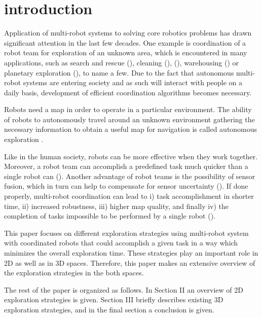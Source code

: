 \section{introduction}


Application of multi-robot systems to solving core robotics problems has drawn significant attention in the last few decades. One example is coordination of a robot team for exploration of an unknown area, which is encountered in many applications, such as search and rescue (\cite{Murphy2004}), cleaning (\cite{Endres}), (\cite{Pinheiro2015}), warehousing (\cite{Wurman2008}) or planetary exploration (\cite{Mataric2001}), to name a few. Due to the fact that autonomous multi-robot systems are entering society and as such will interact with people on a daily basis, development of efficient coordination algorithms becomes necessary.

Robots need a map in order to operate in a particular environment. The ability of robots to autonomously travel around an unknown environment gathering the necessary information to obtain a useful map for navigation is called autonomous exploration \cite{Julia2012}. 

Like in the human society, robots can be more effective when they work together. Moreover, a robot team can accomplish a predefined task much quicker than a single robot can (\cite{Dias2000}). Another advantage of robot teams is the possibility of sensor fusion, which in turn can help to compensate for sensor uncertainty (\cite{Wurm2008}).
If done properly, multi-robot coordination can lead to i) task accomplishment in shorter time, ii) increased robustness, iii) higher map quality, and finally iv) the completion of tasks impossible to be performed by a single robot (\cite{Dias2006}).

This paper focuses on different exploration strategies using multi-robot system with coordinated robots that could accomplish a given task in a way which minimizes the overall exploration time. These strategies play an important role in 2D as well as in 3D spaces. Therefore, this paper makes an extensive overview of the exploration strategies in the both spaces.
 
The rest of the paper is organized as follows. 
In Section II an overview of 2D exploration strategies is given. Section
III briefly describes existing 3D exploration strategies, and in the final section a conclusion is given.

